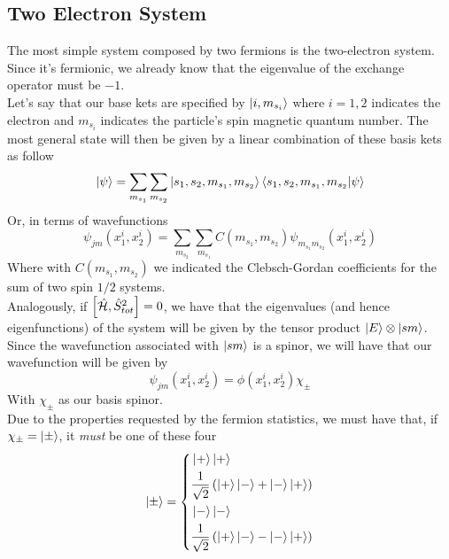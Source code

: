\documentclass[../qm.tex]{subfiles}
\begin{document}
	\subsection{Two Electron System}
	The most simple system composed by two fermions is the two-electron system. Since it's fermionic, we already know that the eigenvalue of the exchange operator must be $-1$.\\
	Let's say that our base kets are specified by $\ket{i,m_{s_i}}$ where $i=1,2$ indicates the electron and $m_{s_i}$ indicates the particle's spin magnetic quantum number. The most general state will then be given by a linear combination of these basis kets as follow
	\begin{equation*}
		\ket{\psi}=\sum_{m_{s_1}}\sum_{m_{s_2}}\ket{s_1,s_2,m_{s_1},m_{s_2}}\bra{s_1,s_2,m_{s_1},m_{s_2}}\ket{\psi}
	\end{equation*}
	Or, in terms of wavefunctions
	\begin{equation*}
		\psi_{jm}(x^i_1,x^i_2)=\sum_{m_{s_2}}\sum_{m_{s_1}}C(m_{s_1},m_{s_2})\psi_{m_{s_1}m_{s_2}}(x^i_1,x^i_2)
	\end{equation*}
	Where with $C(m_{s_1},m_{s_2})$ we indicated the Clebsch-Gordan coefficients for the sum of two spin $1/2$ systems.\\
	Analogously, if $\comm{\opr{\ham}}{\opr{S}^2_{tot}}=0$, we have that the eigenvalues (and hence eigenfunctions) of the system will be given by the tensor product $\ket{E}\otimes\ket{sm}$. Since the wavefunction associated with $\ket{sm}$ is a spinor, we will have that our wavefunction will be given by
	\begin{equation*}
		\psi_{jm}(x^i_1,x^i_2)=\phi(x_1^i,x_2^i)\chi_{\pm}
	\end{equation*}
	With $\chi_{\pm}$ as our basis spinor.\\
	Due to the properties requested by the fermion statistics, we must have that, if $\chi_{\pm}=\ket{\pm}$, it \emph{must} be one of these four
	\begin{equation}
		\begin{aligned}
			\ket{\pm}=\left\{ \begin{aligned}
					&\ket{+}\ket{+}\\
					&\frac{1}{\sqrt{2}}\left( \ket{+}\ket{-}+\ket{-}\ket{+} \right)\\
					&\ket{-}\ket{-}\\
					&\frac{1}{\sqrt{2}}\left( \ket{+}\ket{-}-\ket{-}\ket{+} \right)
				\end{aligned}
				\right.
		\end{aligned}
		\label{eq:tripletsingletstates}
	\end{equation}
\end{document}
